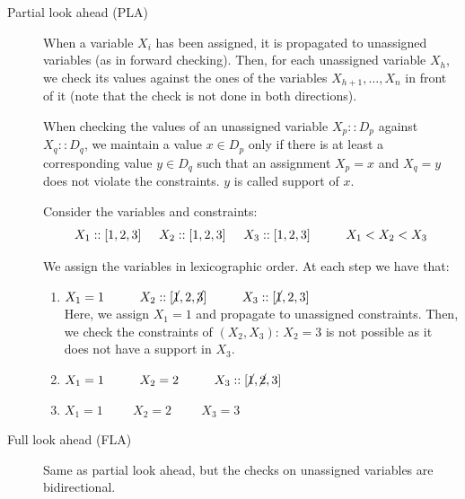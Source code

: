 \begin{description}
    \item[Partial look ahead (PLA)] 
        When a variable $X_i$ has been assigned, it is propagated to unassigned variables (as in forward checking).
        Then, for each unassigned variable $X_h$, we check its values against the ones of the variables $X_{h+1}, \dots, X_{n}$ in front of it 
        (note that the check is not done in both directions).
        
        When checking the values of an unassigned variable $X_p :: D_p$ against $X_q :: D_q$, 
        we maintain a value $x \in D_p$ only if there is at least a corresponding value $y \in D_q$ such that 
        an assignment $X_p=x$ and $X_q=y$ does not violate the constraints. 
        $y$ is called support  of $x$. 

        \begin{example}
            Consider the variables and constraints: 
            \[ X_1 :: [1, 2, 3] \hspace{0.5cm} X_2 :: [1, 2, 3] \hspace{0.5cm} X_3 :: [1, 2, 3]  \hspace{1cm}  X_1 < X_2 < X_3 \]

            We assign the variables in lexicographic order. At each step we have that:
            \begin{enumerate}
                \item $X_1 = 1 \hspace{1cm} X_2 :: [\cancel{1}, 2, \cancel{3}] \hspace{1cm} X_3 :: [\cancel{1}, 2, 3]$ \\
                    Here, we assign $X_1=1$ and propagate to unassigned constraints.
                    Then, we check the constraints of $(X_2, X_3)$: $X_2 = 3$ is not possible as it does not have a support in $X_3$.
                \item $X_1 = 1 \hspace{1cm} X_2 = 2 \hspace{1cm} X_3 :: [\cancel{1}, \cancel{2}, 3]$
                \item $X_1 = 1 \hspace{1cm} X_2 = 2 \hspace{1cm} X_3 = 3$
            \end{enumerate}
        \end{example}

    \item[Full look ahead (FLA)] 
        Same as partial look ahead, but the checks on unassigned variables are bidirectional.


\end{description}
